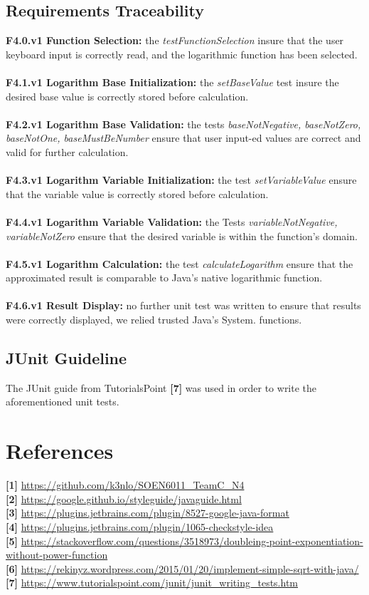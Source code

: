 \documentclass[12pt]{extarticle}
\newcommand{\<}{\langle}
\renewcommand{\>}{\rangle}
\theoremstyle{definition}
\begin{document}
\subsection{Requirements Traceability}
\textbf{F4.0.v1 Function Selection:} the \textit{testFunctionSelection} insure that the user keyboard input is correctly read, and the logarithmic function has been selected. \\ \\
\textbf{F4.1.v1 Logarithm Base Initialization:} the \textit{setBaseValue} test insure the desired base value is correctly stored before calculation. \\ \\
\textbf{F4.2.v1 Logarithm Base Validation: } the tests \textit{baseNotNegative, baseNotZero, baseNotOne, baseMustBeNumber} ensure that user input-ed values are correct and valid for further calculation. \\ \\
\textbf{F4.3.v1 Logarithm Variable Initialization:} the test \textit{setVariableValue} ensure that the variable value is correctly stored before calculation. \\ \\
\textbf{F4.4.v1 Logarithm Variable Validation:} the Tests \textit{variableNotNegative, variableNotZero} ensure that the desired variable is within the function's domain. \\ \\
\textbf{F4.5.v1 Logarithm Calculation:} the test \textit{calculateLogarithm} ensure that the approximated result is comparable to Java's native logarithmic function.\\ \\
\textbf{F4.6.v1 Result Display:} no further unit test was written to ensure that results were correctly displayed, we relied trusted Java's System. functions.

\subsection{JUnit Guideline}
The JUnit guide from TutorialsPoint \textbf{[7]} was used in order to write the aforementioned unit tests.




\section*{References}
\textbf{[1]} \url{https://github.com/k3nlo/SOEN6011\_TeamC\_N4}\\
\textbf{[2]} \url{https://google.github.io/styleguide/javaguide.html}\\
\textbf{[3]} \url{https://plugins.jetbrains.com/plugin/8527-google-java-format}\\
\textbf{[4]} \url{https://plugins.jetbrains.com/plugin/1065-checkstyle-idea}\\
\textbf{[5]} \url{https://stackoverflow.com/questions/3518973/doubleing-point-exponentiation-without-power-function}\\
\textbf{[6]} \url{https://rekinyz.wordpress.com/2015/01/20/implement-simple-sqrt-with-java/}\\
\textbf{[7]} \url{https://www.tutorialspoint.com/junit/junit_writing_tests.htm}\\
\end{document}
